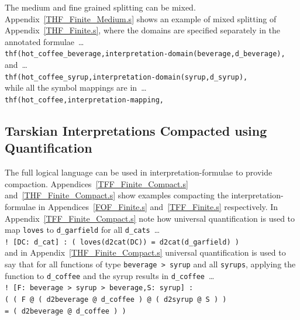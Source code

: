 \documentclass{easychair}
\newcommand{\smalltt}[1]{\small \texttt{#1}}
\begin{document}
The medium and fine grained splitting can be mixed.
Appendix~\ref{THF_Finite_Medium.s} shows an example of mixed splitting of 
Appendix~\ref{THF_Finite.s}, where the domains are specified separately in the annotated
formulae~\ldots \\
\hspace*{1.0em}\smalltt{thf(hot\_coffee\_beverage,interpretation-domain(beverage,d\_beverage),} \\
and~\ldots \\
\hspace*{1.0em}\smalltt{thf(hot\_coffee\_syrup,interpretation-domain(syrup,d\_syrup),} \\
while all the symbol mappings are in~\ldots \\
\hspace*{1.0em}\smalltt{thf(hot\_coffee,interpretation-mapping,}

\subsection{Tarskian Interpretations Compacted using Quantification}
\label{NewTarskianCompact}

The full logical language can be used in interpretation-formulae to provide compaction.
Appendices~\ref{TFF_Finite_Compact.s} and~\ref{THF_Finite_Compact.s} show examples compacting the
interpretation-formulae in Appendices~\ref{FOF_Finite.s} and~\ref{TFF_Finite.s} respectively.
In Appendix~\ref{TFF_Finite_Compact.s} note how universal quantification is used to map
{\tt loves} to {\tt d\_garfield} for all {\tt d\_cats}~\ldots \\
\hspace*{0.5cm}\smalltt{!\,[DC:\,d\_cat]\,:\,(\,loves(d2cat(DC))\,=\,d2cat(d\_garfield)\,)} \\
and in Appendix~\ref{THF_Finite_Compact.s} universal quantification is used to say that for all
functions of type {\tt beverage > syrup} and all {\tt syrups}, applying the function to
{\tt d\_coffee} and the syrup results in {\tt d\_coffee}~\ldots \\
\hspace*{0.5cm}\smalltt{!\,[F:\,beverage\,>\,syrup\,>\,beverage,S:\,syrup]\,:} \\
\hspace*{0.8cm}\smalltt{(\,(\,F\,@\,(\,d2beverage\,@\,d\_coffee\,)\,@\,(\,d2syrup\,@\,S\,)\,)} \\
\hspace*{0.8cm}\smalltt{=\,(\,d2beverage\,@\,d\_coffee\,)\,)}
\end{document}
